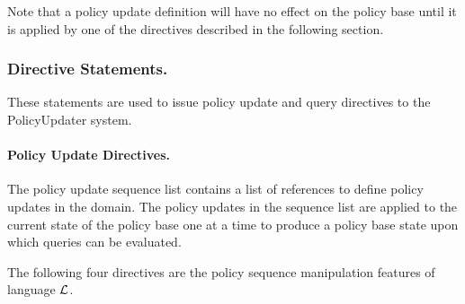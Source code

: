 \documentclass[global,twocolumn,final]{svjour}
\begin{document}
          Note that a policy update definition will have no effect on the
          policy base until it is applied by one of the directives described in
          the following section.

        \subsubsection{Directive Statements.}

          These statements are used to issue policy update and query directives
          to the PolicyUpdater system.

        \paragraph{Policy Update Directives.}

        The policy update sequence list contains a list of references to
        define policy updates in the domain. The policy updates in the
        sequence list are applied to the current state of the policy base one
        at a time to produce a policy base state upon which queries can be
        evaluated.

        The following four directives are the policy sequence manipulation
        features of language $\cal{L}$.
\end{document}
